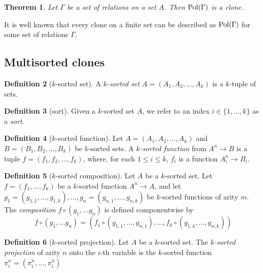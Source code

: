 \documentclass{amsart}
\numberwithin{equation}{section}
\theoremstyle{plain}
\newtheorem{theorem}{Theorem}[section]
\theoremstyle{definition}
\newtheorem{definition}[theorem]{Definition}
\def\set#1{#1}
\def\Pol{{\rm Pol}}
\begin{document}
\begin{theorem}
\cite{bergman} Let $\Gamma$ be a set of relations on a set $\set{A}$. Then $\Pol(\Gamma)$ is a clone.
\end{theorem}


It is well known \cite{bodnarchuk,geiger} that every clone on a finite set can be described as $\Pol(\Gamma)$ for some set of relations $\Gamma$.  

\subsection{Multisorted clones}

\begin{definition}[$k$-sorted set]
A {\it $k$-sorted set} $\set{A}=(\set{A}_1,\set{A}_2,\dots,\set{A}_k)$ is a $k$-tuple of sets.
\end{definition}

\begin{definition}[sort]
Given a $k$-sorted set $\set{A}$, we refer to an index $i\in\{1,\dots,k\}$ as a \emph{sort}.
\end{definition}

\begin{definition}[$k$-sorted function]
Let $\set{A}=(\set{A}_1,\set{A}_2,\dots,\set{A}_k)$ and $\set{B}=(\set{B}_1,\set{B}_2,\dots,\set{B}_k)$ be $k$-sorted sets. A {\em $k$-sorted function} from $\set{A}^n \to \set{B}$ is a tuple $f=(f_1,f_2,\dots,f_k)$, where, for each $1\leq i\leq k$, $f_i$ is a function $\set{A}_i^n\to \set{B}_i$.
\end{definition}

\begin{definition}[$k$-sorted composition]
Let $\set{A}$ be a $k$-sorted set. Let $f=(f_1,\dots,f_k)$ be a $k$-sorted function $\set{A}^n\to \set{A}$, and let $g_1=(g_{1,1},\dots,g_{1,k}),\dots,g_n=(g_{n,1},\dots,g_{n,k})$ be $k$-sorted functions of arity $m$. The {\em composition} $f\circ(g_1,\dots g_n)$ is defined componentwise by
$$f\circ(g_1,\dots g_n) = (f_1\circ (g_{1,1},\dots,g_{n,1}), \dots, f_k\circ (g_{1,k},\dots,g_{n,k}))$$ 
\end{definition}

\begin{definition}[$k$-sorted projection]
Let $\set{A}$ be a $k$-sorted set. The {\em $k$-sorted projection} of arity $n$ onto the $i$-th variable is the $k$-sorted function $\pi_i^n = (\pi_i^n,\dots ,\pi_i^n)$
\end{definition}
\end{document}
